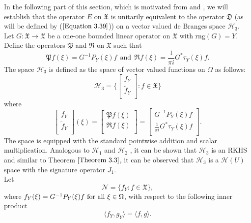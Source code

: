 \documentclass [12pt,reqno]{amsart}
\numberwithin{equation}{subsection}
\numberwithin{equation}{section}
\begin{document}
In the following part of this section, which is motivated from \cite{dd} and \cite{mahapatra}, we will establish that the operator \(E\) on \(\mathfrak{X}\) is unitarily equivalent to the operator \(\mathfrak{D}\) (as will be defined by ($\ref{Equation 3.39}$)) on a vector valued de Branges space \(\mathcal{H}_3\).\\
Let $G : \mathfrak{X} \rightarrow \mathfrak{X}$ be a one-one bounded linear operator on $\mathfrak{X}$ with $\mathrm{rng}(G)=Y$. Define the operators $\mathfrak{P}$ and $\mathfrak{R}$ on $\mathfrak{X}$ such that \begin{equation}
\mathfrak{P}f(\xi)=G^{-1}P_{Y}(\xi)f~ ~\mbox{and}~~\mathfrak{R}f(\xi)=\frac{1}{\pi i} G^{*} \tau_{Y}(\xi)f.
\end{equation}
The space $\mathcal{H}_3$ is defined as the  space of vector valued functions on $\Omega$ as follows: $$\mathcal{H}_3= \biggl \lbrace \begin{bmatrix} 
	f_Y  \\
	\tilde{f}_Y \\
	\end{bmatrix} : f \in \mathfrak{X}\biggl \rbrace$$ where  $$\begin{bmatrix} 
	f_Y  \\
	\tilde{f}_Y \\
	\end{bmatrix}
	(\xi)=\begin{bmatrix} 
	\mathfrak{P}f(\xi)  \\
	\mathfrak{R}f(\xi) \\
	\end{bmatrix}
	=
	         \begin{bmatrix} 
	G^{-1}P_{Y}(\xi)f  \\
	\frac{1}{\pi i} G^{*} \tau_{Y}(\xi)f \\
	\end{bmatrix}.$$
The space is equipped with the standard pointwise addition and scalar multiplication. Analogous to $\mathcal{H}_1$ and $\mathcal{H}_2$ , it can be shown that $\mathcal{H}_3$ is an RKHS and similar to Theorem $\ref{Theorem 3.3}$, it can be observed that $\mathcal{H}_3$ is a $\mathcal{H}(U)$ 
space with the signature operator $J_1$.\\
Let 
\[
\mathcal{N} = \{ f_Y : f \in \mathfrak{X} \},
\]
where \(f_Y(\xi) = G^{-1}P_Y(\xi)f$ for all $\xi \in \Omega\), with respect to the following inner product
\begin{equation} \label{Equation 3.35}
\langle f_Y, g_Y \rangle = \langle f, g \rangle.
\end{equation}
\end{document}
